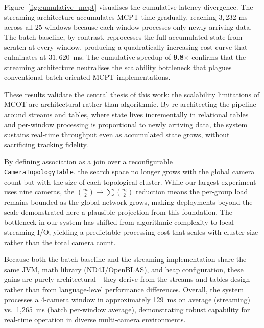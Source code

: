 \documentclass[5p,times]{elsarticle}
\begin{document}
Figure~\ref{fig:cumulative_mcpt} visualises the cumulative latency divergence. The streaming architecture accumulates MCPT time gradually, reaching $3,232$ ms across all $25$ windows because each window processes only newly arriving data. The batch baseline, by contrast, reprocesses the full accumulated state from scratch at every window, producing a quadratically increasing cost curve that culminates at $31,620$~ms. The cumulative speedup of \textbf{9.8$\times$} confirms that the streaming architecture neutralises the scalability bottleneck that plagues conventional batch-oriented MCPT implementations.

These results validate the central thesis of this work: the scalability limitations of MCOT are architectural rather than algorithmic. By re-architecting the pipeline around streams and tables, where state lives incrementally in relational tables and per-window processing is proportional to newly arriving data, the system sustains real-time throughput even as accumulated state grows, without sacrificing tracking fidelity. 

By defining association as a join over a reconfigurable \\\texttt{CameraTopologyTable}, the search space no longer grows with the global camera count but with the size of each topological cluster. While our largest experiment uses nine cameras, the $\binom{m}{2} \to \sum \binom{n_i}{2}$ reduction means the per-group load remains bounded as the global network grows, making deployments beyond the scale demonstrated here a plausible projection from this foundation. The bottleneck in our system has shifted from algorithmic complexity to local streaming I/O, yielding a predictable processing cost that scales with cluster size rather than the total camera count.

Because both the batch baseline and the streaming implementation share the same JVM, math library (ND4J/OpenBLAS), and heap configuration, these gains are purely architectural---they derive from the streams-and-tables design rather than from language-level performance differences. Overall, the system processes a 4-camera window in approximately 129~ms on average (streaming) vs.~1,265~ms (batch per-window average), demonstrating robust capability for real-time operation in diverse multi-camera environments.
\end{document}
